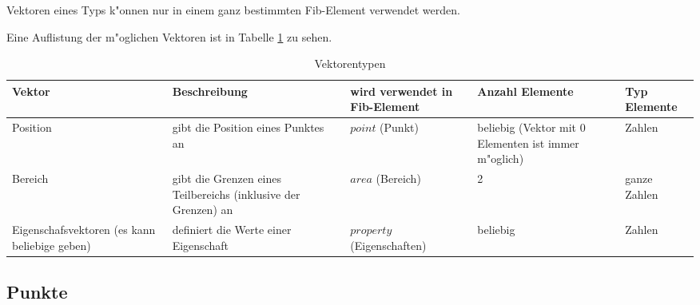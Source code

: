 Vektoren eines Typs k"onnen nur in einem ganz bestimmten Fib-Element verwendet werden.

Eine Auflistung der m"oglichen Vektoren ist in Tabelle \ref{tableVectorTyps} zu sehen.

\begin{table}[htbp]
\begin{center}
\begin{small}
\begin{tabular}{|p{20mm}|p{35mm}|p{15mm}|p{20mm}|p{15mm}|}\hline
	Vektor & Beschreibung & wird verwendet in Fib-Element & Anzahl Elemente & Typ Elemente \\\hline\hline
	Position & gibt die Position eines Punktes an & $point$ (Punkt) & beliebig (Vektor mit 0 Elementen ist immer m"oglich) & Zahlen\\\hline
	Bereich & gibt die Grenzen eines Teilbereichs (inklusive der Grenzen) an & $area$ (Bereich) & 2 & ganze Zahlen\\\hline
	Eigenschafs\-vektoren (es kann beliebige geben) & definiert die Werte einer Eigenschaft & $property$ (Eigenschaften) & beliebig & Zahlen\\\hline
\end{tabular}
\end{small}
\end{center}
\caption{Vektorentypen}
\label{tableVectorTyps}
\end{table}



\subsection{Punkte}
\label{fibPoint}\label{secFibPoint}

